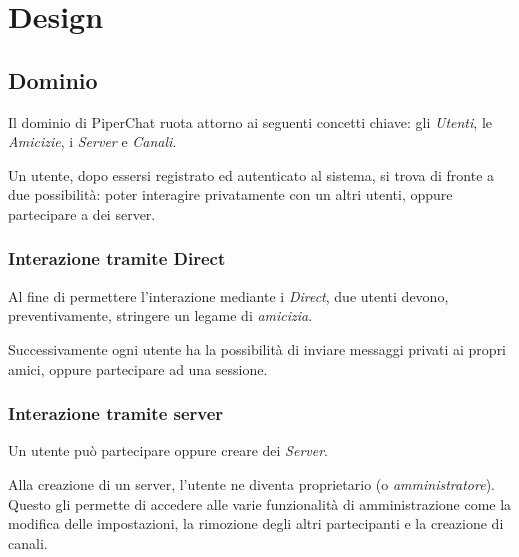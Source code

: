 \section{Design}






%
%
%
\subsection{Dominio}

Il dominio di PiperChat ruota attorno ai seguenti concetti chiave: gli \emph{Utenti}, le \emph{Amicizie}, i \emph{Server} e \emph{Canali}.

Un utente, dopo essersi registrato ed autenticato al sistema, si trova di fronte a due possibilità: poter interagire privatamente con un altri utenti, oppure partecipare a dei server.

%
%
%
\subsubsection{Interazione tramite Direct}

Al fine di permettere l'interazione mediante i \emph{Direct}, due utenti devono, preventivamente, stringere un legame di \emph{amicizia}.

Successivamente ogni utente ha la possibilità di inviare messaggi privati ai propri amici, oppure partecipare ad una sessione.

%
%
%
\subsubsection{Interazione tramite server}

Un utente può partecipare oppure creare dei \emph{Server}.

Alla creazione di un server, l'utente ne diventa proprietario (o \textit{amministratore}).
%
Questo gli permette di accedere alle varie funzionalità di amministrazione come la modifica delle impostazioni, la rimozione degli altri partecipanti e la creazione di canali.

